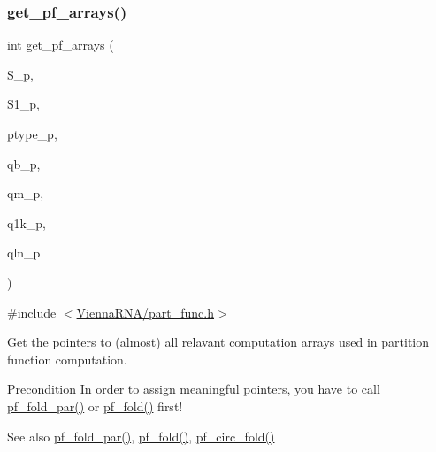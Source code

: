 \subsubsection{\texorpdfstring{get\+\_\+pf\+\_\+arrays()}{get\_pf\_arrays()}}
{\footnotesize\ttfamily int get\+\_\+pf\+\_\+arrays (\begin{DoxyParamCaption}\item[{short $\ast$$\ast$}]{S\+\_\+p,  }\item[{short $\ast$$\ast$}]{S1\+\_\+p,  }\item[{char $\ast$$\ast$}]{ptype\+\_\+p,  }\item[{\hyperlink{group__data__structures_ga31125aeace516926bf7f251f759b6126}{F\+L\+T\+\_\+\+O\+R\+\_\+\+D\+BL} $\ast$$\ast$}]{qb\+\_\+p,  }\item[{\hyperlink{group__data__structures_ga31125aeace516926bf7f251f759b6126}{F\+L\+T\+\_\+\+O\+R\+\_\+\+D\+BL} $\ast$$\ast$}]{qm\+\_\+p,  }\item[{\hyperlink{group__data__structures_ga31125aeace516926bf7f251f759b6126}{F\+L\+T\+\_\+\+O\+R\+\_\+\+D\+BL} $\ast$$\ast$}]{q1k\+\_\+p,  }\item[{\hyperlink{group__data__structures_ga31125aeace516926bf7f251f759b6126}{F\+L\+T\+\_\+\+O\+R\+\_\+\+D\+BL} $\ast$$\ast$}]{qln\+\_\+p }\end{DoxyParamCaption})}



{\ttfamily \#include $<$\hyperlink{part__func_8h}{Vienna\+R\+N\+A/part\+\_\+func.\+h}$>$}



Get the pointers to (almost) all relavant computation arrays used in partition function computation. 

\begin{DoxyPrecond}{Precondition}
In order to assign meaningful pointers, you have to call \hyperlink{group__part__func__global__deprecated_gac4f95bee734b2563a3d6e9932117ebdf}{pf\+\_\+fold\+\_\+par()} or \hyperlink{group__part__func__global__deprecated_gadc3db3d98742427e7001a7fd36ef28c2}{pf\+\_\+fold()} first! 
\end{DoxyPrecond}
\begin{DoxySeeAlso}{See also}
\hyperlink{group__part__func__global__deprecated_gac4f95bee734b2563a3d6e9932117ebdf}{pf\+\_\+fold\+\_\+par()}, \hyperlink{group__part__func__global__deprecated_gadc3db3d98742427e7001a7fd36ef28c2}{pf\+\_\+fold()}, \hyperlink{group__part__func__global__deprecated_ga819ce5fca8984004ac81c4a3b04cb735}{pf\+\_\+circ\+\_\+fold()} 
\end{DoxySeeAlso}

